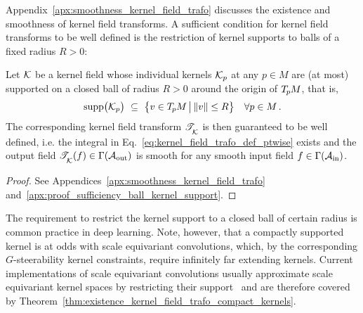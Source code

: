 Appendix~\ref{apx:smoothness_kernel_field_trafo} discusses the existence and smoothness of kernel field transforms.
A sufficient condition for kernel field transforms to be well defined is the restriction of kernel supports to balls of a fixed radius $R>0$:
\begin{thm}
\label{thm:existence_kernel_field_trafo_compact_kernels}
    Let $\mathcal{K}$ be a kernel field whose individual kernels $\mathcal{K}_p$ at any $p\in M$ are (at most) supported on a closed ball of radius $R>0$ around the origin of $T_{\mkern-1.5mu p}\mkern-.5muM$, that is,
    \begin{align}
        \operatorname{supp}\!\big(\mathcal{K}_p\big)\ \subseteq\ \big\{ v\in T_{\mkern-1.5mu p}\mkern-.5muM \,\big|\, \lVert v\rVert \leq R \big\} \quad \forall p\in M \,.
    \end{align}
    The corresponding kernel field transform $\mathscr{T}_{\overset{}{\mkern-0mu \mathcal{K}}}$ is then guaranteed to be well defined, i.e. the integral in Eq.~\eqref{eq:kernel_field_trafo_def_ptwise} exists and the output field $\mathscr{T}_{\overset{}{\mkern-0mu \mathcal{K}}}(f) \in \Gamma(\mathcal{A}_\textup{out})$ is smooth for any smooth input field $f\in\Gamma(\mathcal{A}_\textup{in})$.
\end{thm}
\begin{proof}
    See Appendices~\ref{apx:smoothness_kernel_field_trafo} and~\ref{apx:proof_sufficiency_ball_kernel_support}.
\end{proof}
The requirement to restrict the kernel support to a closed ball of certain radius is common practice in deep learning.
Note, however, that a compactly supported kernel is at odds with scale equivariant convolutions, which, by the corresponding $G$-steerability kernel constraints, require infinitely far extending kernels.
Current implementations of scale equivariant convolutions usually approximate scale equivariant kernel spaces by restricting their support~\cite{marcos2018scale,Worrall2019DeepScaleSpaces,ghosh2019scale,zhu2019scale,bekkers2020bspline,Sosnovik2020scale,naderi2020scalesteerable} and are therefore covered by Theorem~\ref{thm:existence_kernel_field_trafo_compact_kernels}.


